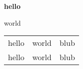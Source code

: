 

\begin{center}
  \bfseries hello
\end{center}
world

\begin{tabular}{c |c c}
hello & world & blub\tabularnewline
hello & world & blub
\end{tabular}



